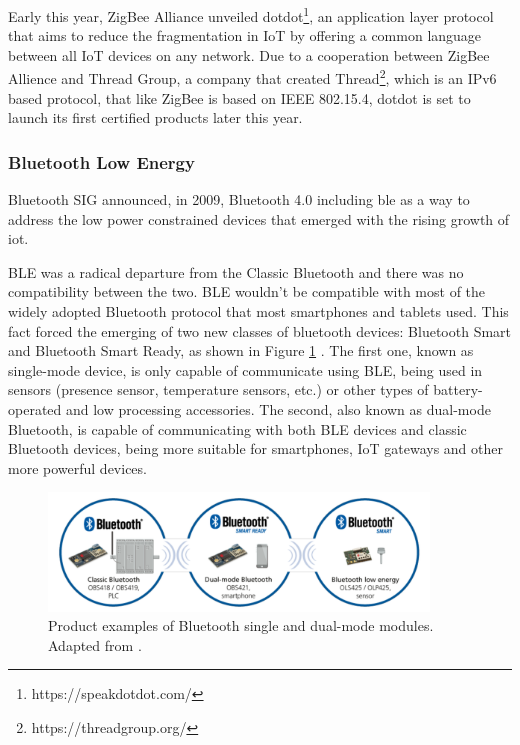 Early this year, ZigBee Alliance unveiled dotdot\footnote{https://speakdotdot.com/}, an application layer protocol that aims to reduce the fragmentation in IoT by offering a common language between all IoT devices on any network. Due to a cooperation between ZigBee Allience and Thread Group, a company that created Thread\footnote{https://threadgroup.org/}, which is an IPv6 based protocol, that like ZigBee is based on IEEE 802.15.4, dotdot is set to launch its first certified products later this year.


\subsubsection{Bluetooth Low Energy}

Bluetooth SIG announced, in 2009, Bluetooth 4.0 including \acf{ble} as a way to address the low power constrained devices that emerged with the rising growth of \ac{iot}. 

BLE was a radical departure from the Classic Bluetooth and there was no compatibility between the two. BLE wouldn't be compatible with most of the widely adopted Bluetooth protocol that most smartphones and tablets used. This fact forced the emerging of two new classes of bluetooth devices: Bluetooth Smart and Bluetooth Smart Ready, as shown in Figure \ref{fig:ble1} \cite{Andersson2014}. The first one, known as single-mode device, is only capable of communicate using BLE, being used in sensors (presence sensor, temperature sensors, etc.) or other types of battery-operated and low processing accessories. The second, also known as dual-mode Bluetooth, is capable of communicating with both BLE devices and classic Bluetooth devices, being more suitable for smartphones, IoT gateways and other more powerful devices. 

\begin{figure}[H]
	\centering
	\includegraphics[width=0.9\textwidth]{figures/ble.png}
	\caption{Product examples of Bluetooth single and dual-mode modules. Adapted from \cite{Andersson2014}.}
	\label{fig:ble1}
\end{figure}


